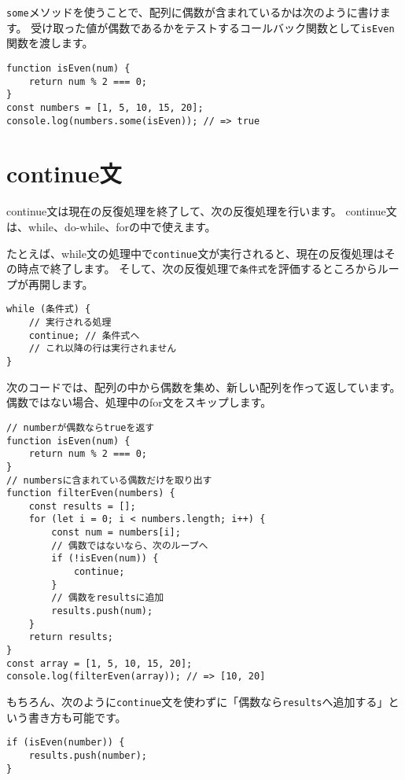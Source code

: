 \texttt{some}メソッドを使うことで、配列に偶数が含まれているかは次のように書けます。
受け取った値が偶数であるかをテストするコールバック関数として\texttt{isEven}関数を渡します。

\begin{lstlisting}
function isEven(num) {
    return num % 2 === 0;
}
const numbers = [1, 5, 10, 15, 20];
console.log(numbers.some(isEven)); // => true
\end{lstlisting}

\hypertarget{continue-statement}{%
\section{continue文}\label{continue-statement}}

continue文は現在の反復処理を終了して、次の反復処理を行います。
continue文は、while、do-while、forの中で使えます。

たとえば、while文の処理中で\texttt{continue}文が実行されると、現在の反復処理はその時点で終了します。
そして、次の反復処理で\texttt{条件式}を評価するところからループが再開します。

\begin{lstlisting}
while (条件式) {
    // 実行される処理
    continue; // 条件式へ
    // これ以降の行は実行されません
}
\end{lstlisting}

次のコードでは、配列の中から偶数を集め、新しい配列を作って返しています。
偶数ではない場合、処理中のfor文をスキップします。

\begin{lstlisting}
// numberが偶数ならtrueを返す
function isEven(num) {
    return num % 2 === 0;
}
// numbersに含まれている偶数だけを取り出す
function filterEven(numbers) {
    const results = [];
    for (let i = 0; i < numbers.length; i++) {
        const num = numbers[i];
        // 偶数ではないなら、次のループへ
        if (!isEven(num)) {
            continue;
        }
        // 偶数をresultsに追加
        results.push(num);
    }
    return results;
}
const array = [1, 5, 10, 15, 20];
console.log(filterEven(array)); // => [10, 20]
\end{lstlisting}

もちろん、次のように\texttt{continue}文を使わずに「偶数なら\texttt{results}へ追加する」という書き方も可能です。

\begin{lstlisting}
if (isEven(number)) {
    results.push(number);
}
\end{lstlisting}

